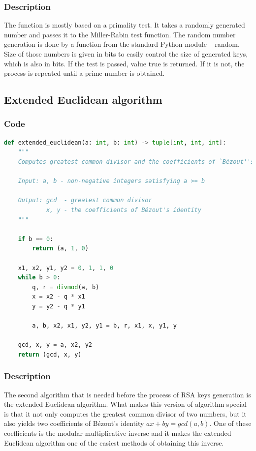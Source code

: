 \documentclass{article}
\begin{document}
\normalsize

\subsubsection{Description}
The function is mostly based on a primality test. It takes a randomly generated number and
passes it to the Miller-Rabin test function. The random number generation is done by a function from
the standard Python module -- random. Size of those numbers is given in bits to
easily control the size of generated keys, which is also in bits. If the test is passed, value true is returned.
If it is not, the process is repeated until a prime number is obtained.

\subsection{Extended Euclidean algorithm}
\subsubsection{Code}

\small

\begin{lstlisting}[language=Python]
    def extended_euclidean(a: int, b: int) -> tuple[int, int, int]:
    """
    Computes greatest common divisor and the coefficients of `Bézout''s identity.

    Input: a, b - non-negative integers satisfying a >= b

    Output: gcd  - greatest common divisor
            x, y - the coefficients of Bézout's identity
    """

    if b == 0:
        return (a, 1, 0)

    x1, x2, y1, y2 = 0, 1, 1, 0
    while b > 0:
        q, r = divmod(a, b)
        x = x2 - q * x1
        y = y2 - q * y1

        a, b, x2, x1, y2, y1 = b, r, x1, x, y1, y

    gcd, x, y = a, x2, y2
    return (gcd, x, y)
\end{lstlisting}

\normalsize

\subsubsection{Description}
The second algorithm that is needed before the process of RSA keys generation is the extended Euclidean algorithm. 
What makes this version of algorithm special is that it not only computes the greatest common divisor of two numbers, but 
it also yields two coefficients of Bézout's identity $ax + by = gcd(a, b)$. One of these coefficients is the modular multiplicative inverse and 
it makes the extended Euclidean algorithm one of the easiest methods of obtaining this inverse.
\end{document}
